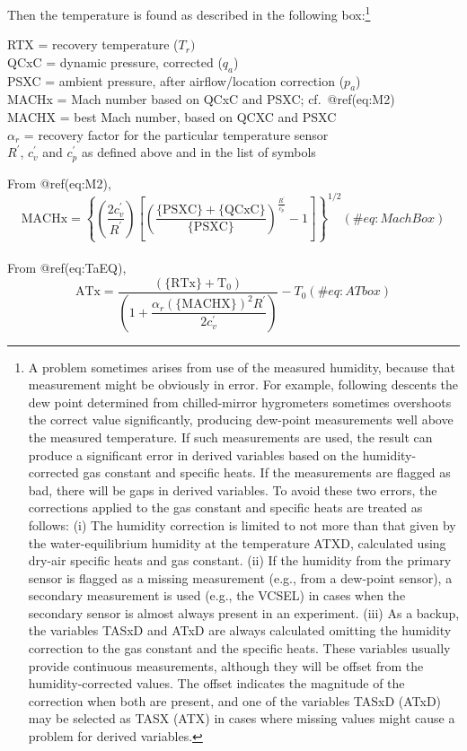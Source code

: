 \documentclass[
  english,
]{book}
\begin{document}
Then the temperature is found as described in the following
box:\footnote{A problem sometimes arises from use of the measured
  humidity, because that measurement might be obviously in error. For
  example, following descents the dew point determined from
  chilled-mirror hygrometers sometimes overshoots the correct value
  significantly, producing dew-point measurements well above the
  measured temperature. If such measurements are used, the result can
  produce a significant error in derived variables based on the
  humidity-corrected gas constant and specific heats. If the
  measurements are flagged as bad, there will be gaps in derived
  variables. To avoid these two errors, the corrections applied to the
  gas constant and specific heats are treated as follows: (i) The
  humidity correction is limited to not more than that given by the
  water-equilibrium humidity at the temperature ATXD, calculated using
  dry-air specific heats and gas constant. (ii) If the humidity from the
  primary sensor is flagged as a missing measurement (e.g., from a
  dew-point sensor), a secondary measurement is used (e.g., the VCSEL)
  in cases when the secondary sensor is almost always present in an
  experiment. (iii) As a backup, the variables TASxD and ATxD are always
  calculated omitting the humidity correction to the gas constant and
  the specific heats. These variables usually provide continuous
  measurements, although they will be offset from the humidity-corrected
  values. The offset indicates the magnitude of the correction when both
  are present, and one of the variables TASxD (ATxD) may be selected as
  TASX (ATX) in cases where missing values might cause a problem for
  derived variables.}

RTX = recovery temperature (\(T_{r})\)\\
QCxC = dynamic pressure, corrected (\(q_{a}\))\\
PSXC = ambient pressure, after airflow/location correction
(\(p_{a}\))\\
MACHx = Mach number based on QCxC and PSXC;
cf.~@ref(eq:M2)\\
MACHX = best Mach number, based on QCXC and PSXC\\
\(\alpha_{r}\) = recovery factor for the particular temperature sensor\\
\(R^{\prime}\), \(c_{v}^{\prime}\) and \(c_{p}^{\prime}\) as defined
above and in the list of symbols

From @ref(eq:M2), \begin{equation}
\mathrm{MACHx}=\left\{ \left(\frac{2c_{v}^{\prime}}{R^{\prime}}\right)\left[\left(\frac{\mathrm{\{PSXC\}+\{QCxC\}}}{\mathrm{\{PSXC\}}}\right)^{\frac{R^{\prime}}{c_{p}^{\prime}}}-1\right]\right\} ^{1/2}  
(\#eq:MachBox)
\end{equation}\\
From @ref(eq:TaEQ), \begin{equation}
\mathrm{ATx}=\frac{\mathrm{\left(\{RTx\}+T_{0}\right)}}{\left(1+\dfrac{\alpha_{r}\mathrm{(\{MACHX\})}^{2}R^{\prime}}{2c_{v}^{\prime}}\right)}-T_{0}
(\#eq:ATbox)
\end{equation}
\end{document}
